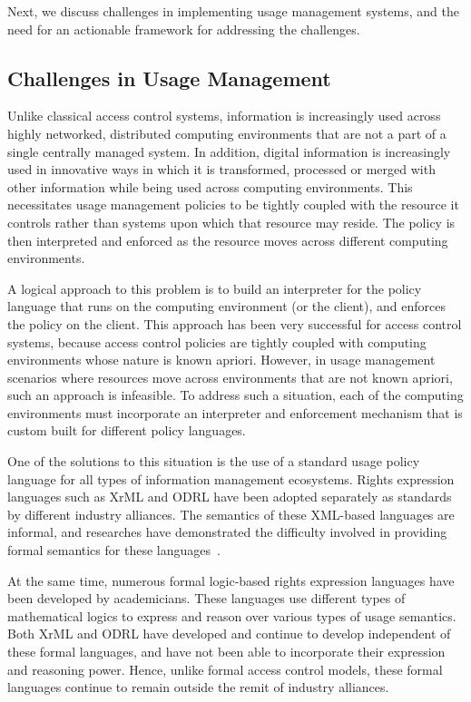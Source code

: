 Next, we discuss challenges in implementing usage management systems, and the need for an actionable framework for addressing the challenges. 

\subsection{Challenges in Usage Management}
Unlike classical access control systems, information is increasingly used across highly networked, distributed computing environments that are not a part of a single centrally managed system.  In addition, digital information is increasingly used in innovative ways in which it is transformed, processed or merged with other information while being used across computing environments.  This necessitates usage management policies to be tightly coupled with the resource it controls rather than systems upon which that resource may reside. The policy is then interpreted and enforced as the resource moves across different computing environments. 

A logical approach to this problem is to build an interpreter for the policy language that runs on the computing environment (or the client), and enforces the policy on the client. This approach has been very successful for access control systems, because access control policies are tightly coupled with computing environments whose nature is known apriori.  However, in usage management scenarios where resources move across environments that are not known apriori, such an approach is infeasible. To address such a situation, each of the computing environments must incorporate an interpreter and enforcement mechanism that is custom built for different policy languages. 

One of the solutions to this situation is the use of a standard usage policy language for all types of information management ecosystems. Rights expression languages such as XrML and ODRL have been adopted separately as standards by different industry alliances. The semantics of these XML-based languages are informal, and researches have demonstrated the difficulty involved in providing formal semantics for these languages~\cite{HaWe:08}. 

At the same time, numerous formal logic-based rights expression languages have been developed by academicians. These languages use different types of mathematical logics to express and reason over various types of usage semantics. Both XrML and ODRL have developed and continue to develop independent of these formal languages, and have not been able to incorporate their expression and reasoning power.  Hence, unlike formal access control models, these formal languages continue to remain outside the remit of industry alliances. 
 
